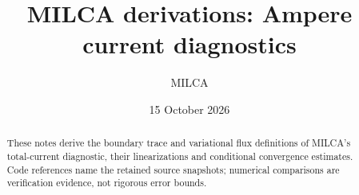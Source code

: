 \documentclass[11pt]{article}
\title{MILCA derivations: Ampere current diagnostics}
\author{MILCA}
\date{15 October 2026}
\begin{document}
\maketitle

\begin{abstract}
These notes derive the boundary trace and variational flux definitions of
MILCA's total-current diagnostic, their linearizations and conditional
convergence estimates. Code references name the retained source snapshots;
numerical comparisons are verification evidence, not rigorous error bounds.
\end{abstract}

\tableofcontents

\end{document}
